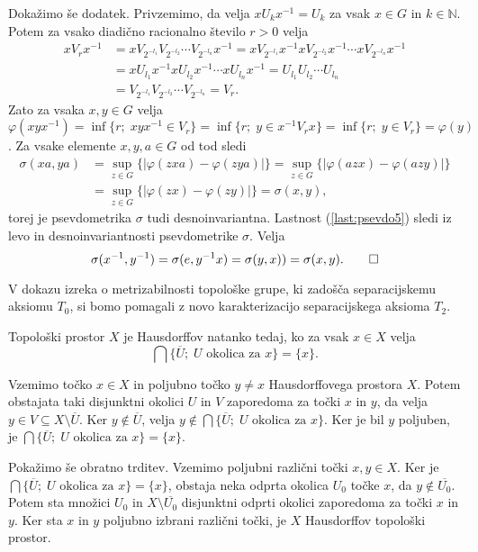 \documentclass[mat1]{fmfdelo}
\newcommand{\N}{\mathbb N}
\newcommand{\closure}[1]{\overline{#1}}
\begin{document}
\begin{dokaz}
Dokažimo še dodatek. Privzemimo, da velja $xU_kx^{-1} = U_k$ za vsak $x \in G$ in $k \in \N$. Potem za vsako diadično racionalno število $r > 0$ velja
\begin{align*}
xV_rx^{-1} &= xV_{2^{-l_1}}V_{2^{-l_2}}\cdots V_{2^{-l_n}}x^{-1} = xV_{2^{-l_1}}x^{-1}xV_{2^{-l_2}}x^{-1}\cdots xV_{2^{-l_n}}x^{-1} \\
&= xU_{l_1}x^{-1}xU_{l_2}x^{-1}\cdots xU_{l_n}x^{-1} = U_{l_1}U_{l_2}\cdots U_{l_n} \\ 
&= V_{2^{-l_1}}V_{2^{-l_2}}\cdots V_{2^{-l_n}} = V_r.
\end{align*}
Zato za vsaka $x, y \in G$ velja $\varphi(xyx^{-1}) = \inf\lbrace r ;\; xyx^{-1} \in V_r \rbrace = \inf\lbrace r ;\; y \in x^{-1}V_rx \rbrace = \inf\lbrace r ;\; y \in V_r \rbrace = \varphi(y)$.
Za vsake elemente $x, y, a \in G$ od tod sledi
\begin{align*}
\sigma(xa, ya) &= \sup_{z \in G}\lbrace |\varphi(zxa) - \varphi(zya)| \rbrace = \sup_{z \in G}\lbrace |\varphi(azx) - \varphi(azy)| \rbrace \\
&= \sup_{z \in G}\lbrace |\varphi(zx) - \varphi(zy)| \rbrace = \sigma(x, y),
\end{align*}
torej je psevdometrika $\sigma$ tudi desnoinvariantna.
Lastnost (\ref{last:psevdo5}) sledi iz levo in desnoinvariantnosti psevdometrike $\sigma$. Velja
\[ \sigma(x^{-1}, y^{-1}) = \sigma(e, y^{-1}x) = \sigma(y, x) ) = \sigma(x, y). \qedhere\]
\end{dokaz}

V dokazu izreka o metrizabilnosti topološke grupe, ki zadošča separacijskemu aksiomu $T_0$, si bomo pomagali z novo karakterizacijo separacijskega aksioma $T_2$.
\begin{trditev}\label{trd:hauskar}
Topološki prostor $X$ je Hausdorffov natanko tedaj, ko za vsak $x \in X$ velja
\[ \bigcap\lbrace \closure{U} ;\; U \text{ okolica za } x \rbrace = \lbrace x \rbrace. \]
\end{trditev}

\begin{dokaz}
Vzemimo točko $x \in X$ in poljubno točko $y \neq x$ Hausdorffovega prostora $X$. Potem obstajata taki disjunktni okolici $U$ in $V$ zaporedoma za točki $x$ in $y$, da velja $y \in V \subseteq X\setminus \closure{U}$. Ker $y \notin \closure{U}$, velja $y \notin \bigcap\lbrace \closure{U} ;\; U \text{ okolica za } x \rbrace$. Ker je bil $y$ poljuben, je $\bigcap\lbrace \closure{U} ;\; U \text{ okolica za } x \rbrace = \lbrace x \rbrace$.

Pokažimo še obratno trditev. Vzemimo poljubni različni točki $x, y \in X$. Ker je $\bigcap\lbrace \closure{U} ;\; U \text{ okolica za } x \rbrace = \lbrace x \rbrace$, obstaja neka odprta okolica $U_0$ točke $x$, da $y \notin \closure{U_0}$. Potem sta množici $U_0$ in $X \setminus \closure{U_0}$ disjunktni odprti okolici zaporedoma za točki $x$ in $y$. Ker sta $x$ in $y$ poljubno izbrani različni točki, je $X$ Hausdorffov topološki prostor.
\end{dokaz}
\end{document}

